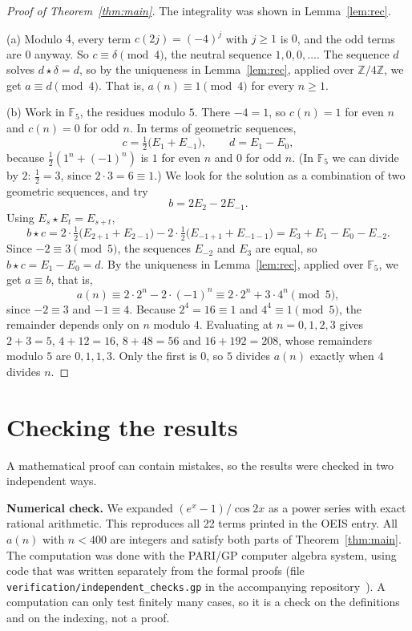 \documentclass[11pt,a4paper]{article}
\theoremstyle{definition}
\theoremstyle{remark}
\newcommand{\Z}{\mathbb{Z}}
\newcommand{\F}{\mathbb{F}}
\newcommand{\para}[1]{\par\medskip\noindent\textbf{#1}\enspace}
\begin{document}
\begin{proof}[Proof of Theorem~\ref{thm:main}]
The integrality was shown in Lemma~\ref{lem:rec}.

(a) Modulo $4$, every term $c(2j)=(-4)^j$ with $j\ge1$ is $0$, and the odd terms are $0$ anyway. So $c\equiv\delta\pmod4$,
the neutral sequence $1,0,0,\dots$. The sequence $d$ solves $d\star\delta=d$, so by the uniqueness in
Lemma~\ref{lem:rec}, applied over $\Z/4\Z$, we get $a\equiv d\pmod4$. That is, $a(n)\equiv1\pmod4$ for every $n\ge1$.

(b) Work in $\F_5$, the residues modulo $5$. There $-4=1$, so $c(n)=1$ for even $n$ and $c(n)=0$ for odd $n$. In terms of
geometric sequences,
\[
c=\tfrac12\bigl(E_1+E_{-1}\bigr),\qquad d=E_1-E_0,
\]
because $\frac12(1^n+(-1)^n)$ is $1$ for even $n$ and $0$ for odd $n$. (In $\F_5$ we can divide by $2$: $\frac12=3$,
since $2\cdot3=6\equiv1$.) We look for the solution as a combination of two geometric sequences, and try
\[
b=2E_2-2E_{-1}.
\]
Using $E_s\star E_t=E_{s+t}$,
\[
b\star c=2\cdot\tfrac12\bigl(E_{2+1}+E_{2-1}\bigr)-2\cdot\tfrac12\bigl(E_{-1+1}+E_{-1-1}\bigr)
=E_3+E_1-E_0-E_{-2}.
\]
Since $-2\equiv3\pmod5$, the sequences $E_{-2}$ and $E_3$ are equal, so $b\star c=E_1-E_0=d$. By the uniqueness in
Lemma~\ref{lem:rec}, applied over $\F_5$, we get $a\equiv b$, that is,
\[
a(n)\equiv2\cdot2^n-2\cdot(-1)^n\equiv2\cdot2^n+3\cdot4^n\pmod5,
\]
since $-2\equiv3$ and $-1\equiv4$. Because $2^4=16\equiv1$ and $4^4\equiv1\pmod5$, the remainder depends only on $n$
modulo $4$. Evaluating at $n=0,1,2,3$ gives $2+3=5$, $4+12=16$, $8+48=56$ and $16+192=208$, whose remainders modulo $5$ are
$0,1,1,3$. Only the first is $0$, so $5$ divides $a(n)$ exactly when $4$ divides $n$.
\end{proof}

\section{Checking the results}\label{sec:checks}

A mathematical proof can contain mistakes, so the results were checked in two independent ways.

\para{Numerical check.}
We expanded $(e^x-1)/\cos2x$ as a power series with exact rational arithmetic. This reproduces all 22 terms printed
in the OEIS entry. All $a(n)$ with $n<400$ are integers and satisfy both parts of Theorem~\ref{thm:main}.
The computation was done with the PARI/GP computer algebra system, using code that was written separately from the
formal proofs (file \texttt{verification/independent\_checks.gp} in the accompanying repository~\cite{repo}).
A computation can only test finitely many cases, so it is a check on the definitions and on the indexing, not a proof.
\end{document}
